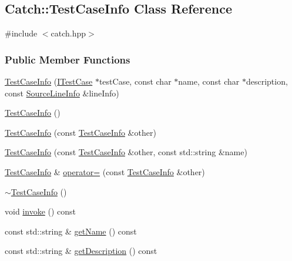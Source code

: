 \hypertarget{classCatch_1_1TestCaseInfo}{\subsection{Catch\-:\-:Test\-Case\-Info Class Reference}
\label{classCatch_1_1TestCaseInfo}
}


{\ttfamily \#include $<$catch.\-hpp$>$}

\subsubsection*{Public Member Functions}
\begin{DoxyCompactItemize}
\item 
\hyperlink{classCatch_1_1TestCaseInfo_a655a1f77df997544c169b3d33e8d6d59}{Test\-Case\-Info} (\hyperlink{structCatch_1_1ITestCase}{I\-Test\-Case} $\ast$test\-Case, const char $\ast$name, const char $\ast$description, const \hyperlink{structCatch_1_1SourceLineInfo}{Source\-Line\-Info} \&line\-Info)
\item 
\hyperlink{classCatch_1_1TestCaseInfo_a2c7714af6674929e88dcadc9e1c23f91}{Test\-Case\-Info} ()
\item 
\hyperlink{classCatch_1_1TestCaseInfo_a822d774c7d74ee7540f06e0b157fdb31}{Test\-Case\-Info} (const \hyperlink{classCatch_1_1TestCaseInfo}{Test\-Case\-Info} \&other)
\item 
\hyperlink{classCatch_1_1TestCaseInfo_a7ef741c52373e4c2d92d02dd2e64a44a}{Test\-Case\-Info} (const \hyperlink{classCatch_1_1TestCaseInfo}{Test\-Case\-Info} \&other, const std\-::string \&name)
\item 
\hyperlink{classCatch_1_1TestCaseInfo}{Test\-Case\-Info} \& \hyperlink{classCatch_1_1TestCaseInfo_ac79abcad5920a22e2f7f4af8a972c0f1}{operator=} (const \hyperlink{classCatch_1_1TestCaseInfo}{Test\-Case\-Info} \&other)
\item 
\hyperlink{classCatch_1_1TestCaseInfo_a5838bd9a48b18aae2a826ed891c16951}{$\sim$\-Test\-Case\-Info} ()
\item 
void \hyperlink{classCatch_1_1TestCaseInfo_aaea81348fa55c02d339bc9f5a0923a0e}{invoke} () const 
\item 
const std\-::string \& \hyperlink{classCatch_1_1TestCaseInfo_a4292fab0a7ed862f156704ebfaef9e86}{get\-Name} () const 
\item 
const std\-::string \& \hyperlink{classCatch_1_1TestCaseInfo_afa19caeb2216e323ad5b0f9fffc00c52}{get\-Description} () const 
\item 

\end{DoxyCompactItemize}
